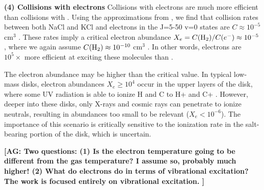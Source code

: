 \documentclass[twocolumn]{aastex62}
\newcommand{\bam}[1]{\textcolor{green!65!black}{\textbf{[BAM: #1]}}}
\newcommand{\ag}[1]{\textcolor{red!65!black}{\textbf{[AG: #1]}}}
\begin{document}
\textbf{(4) Collisions with electrons}
Collisions with electrons are much more efficient than collisions with \hh.
Using the approximations from \citet{Dickinson1975a}, we find that collision
rates between both NaCl and KCl and electrons in the J=5-50 v=0 states are
$C\approx10^{-5}$ cm$^{3}$ \pers.  These rates imply a critical electron
abundance $X_e = C(\textrm{H}_{2})/C(e^-) \approx 10^{-5}$, where we again assume
$C(\textrm{H}_{2})\approx10^{-10}$ cm$^3$ \pers.  In other words, electrons are
$10^5\times$ more efficient at exciting these molecules than \hh.

The electron abundance may be higher than the critical value.
In typical low-mass disks, electron abundances $X_e \geq 10^4$ 
occur in the upper layers of the disk, where some UV radiation
is able to ionize H and C to H+ and C+ \citep{Bergin2007a}.
However, deeper into these disks, only X-rays and cosmic rays
can penetrate to ionize neutrals, resulting in abundances too
small to be relevant ($X_e < 10^{-6}$).  
The importance of this scenario is critically sensitive to the ionization rate
in the salt-bearing portion of the disk, which is uncertain.

\ag{Two questions:
(1) Is the electron temperature going to be different from the
gas temperature?  I assume so, probably much higher!
(2) What do electrons do in terms of vibrational excitation?
The \citet{Dickinson1975a} work is focused entirely on vibrational
excitation.
}



%

\end{document}
